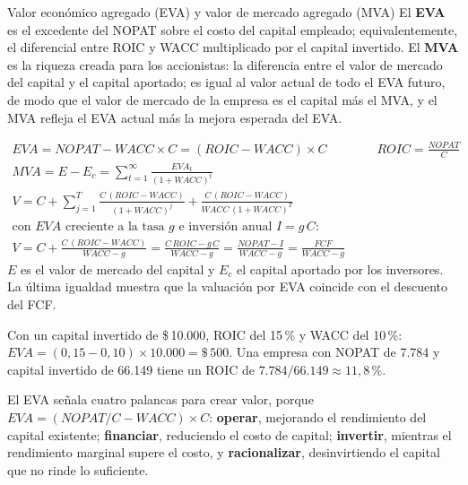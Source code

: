 \begin{definicion}{Valor económico agregado (EVA) y valor de mercado agregado (MVA)}
El \textbf{EVA} es el excedente del NOPAT sobre el costo del capital empleado; equivalentemente, el diferencial entre ROIC y WACC multiplicado por el capital invertido. El \textbf{MVA} es la riqueza creada para los accionistas: la diferencia entre el valor de mercado del capital y el capital aportado; es igual al valor actual de todo el EVA futuro, de modo que el valor de mercado de la empresa es el capital más el MVA, y el MVA refleja el EVA actual más la mejora esperada del EVA.
\end{definicion}

\begin{formulaBox}
\[
\begin{gathered}
EVA = NOPAT - WACC\times C = (ROIC - WACC)\times C
\qquad\qquad
ROIC = \frac{NOPAT}{C}
\\[4pt]
MVA = E - E_c = \sum_{t=1}^{\infty}\frac{EVA_t}{(1+WACC)^{t}}
\\[4pt]
V = C + \sum_{j=1}^{T}\frac{C\,(ROIC-WACC)}{(1+WACC)^{j}} + \frac{C\,(ROIC-WACC)}{WACC\,(1+WACC)^{T}}
\\[4pt]
\text{con } EVA \text{ creciente a la tasa } g \text{ e inversión anual } I = g\,C\text{:}
\\[2pt]
V = C + \frac{C\,(ROIC-WACC)}{WACC-g} = \frac{C\,ROIC - g\,C}{WACC-g} = \frac{NOPAT - I}{WACC-g} = \frac{FCF}{WACC-g}
\end{gathered}
\]
$E$ es el valor de mercado del capital y $E_c$ el capital aportado por los inversores. La última igualdad muestra que la valuación por EVA coincide con el descuento del FCF.
\end{formulaBox}

\begin{ejemplo}
Con un capital invertido de \$\,10.000, ROIC del 15\,\% y WACC del 10\,\%: $EVA = (0{,}15-0{,}10)\times 10.000 = \$\,500$. Una empresa con NOPAT de 7.784 y capital invertido de 66.149 tiene un ROIC de $7.784/66.149 \approx 11{,}8\,\%$.
\end{ejemplo}

El EVA señala cuatro palancas para crear valor, porque $EVA = (NOPAT/C - WACC)\times C$: \textbf{operar}, mejorando el rendimiento del capital existente; \textbf{financiar}, reduciendo el costo de capital; \textbf{invertir}, mientras el rendimiento marginal supere el costo, y \textbf{racionalizar}, desinvirtiendo el capital que no rinde lo suficiente.

